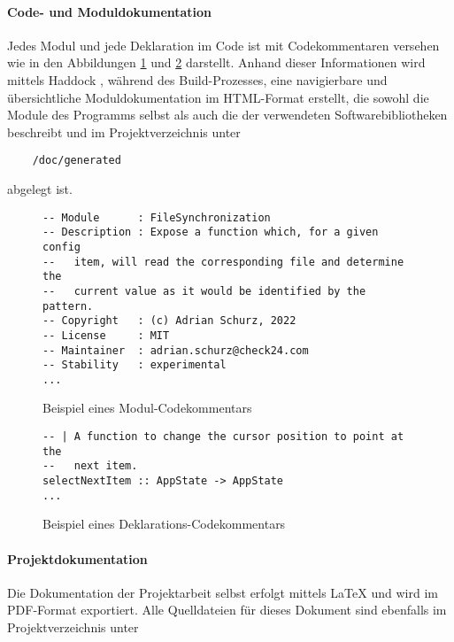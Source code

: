 \paragraph{Code- und Moduldokumentation}
Jedes Modul und jede Deklaration im Code ist mit Codekommentaren versehen wie in
den Abbildungen \ref{codecomment-module} und \ref{codecomment-declaration} darstellt.
Anhand dieser Informationen wird mittels Haddock \cite{haddock}, während des Build-Prozesses,
eine navigierbare und übersichtliche Moduldokumentation im HTML-Format erstellt,
die sowohl die Module des Programms selbst als auch die der verwendeten Softwarebibliotheken
beschreibt und im Projektverzeichnis unter

\begin{verbatim}
    /doc/generated
\end{verbatim}

abgelegt ist.

\begin{figure}
    \caption{Beispiel eines Modul-Codekommentars}
    \label{codecomment-module}
    \begin{verbatim}
-- Module      : FileSynchronization
-- Description : Expose a function which, for a given config
--   item, will read the corresponding file and determine the
--   current value as it would be identified by the pattern.
-- Copyright   : (c) Adrian Schurz, 2022
-- License     : MIT
-- Maintainer  : adrian.schurz@check24.com
-- Stability   : experimental
...
    \end{verbatim}
\end{figure}

\begin{figure}
    \caption{Beispiel eines Deklarations-Codekommentars}
    \label{codecomment-declaration}
    \begin{verbatim}
-- | A function to change the cursor position to point at the
--   next item.
selectNextItem :: AppState -> AppState
...
    \end{verbatim}
\end{figure}

\paragraph{Projektdokumentation}
Die Dokumentation der Projektarbeit selbst erfolgt mittels \LaTeX \cite{latex} und
wird im \gls{PDF}-Format exportiert. Alle Quelldateien für dieses Dokument sind
ebenfalls im Projektverzeichnis unter

